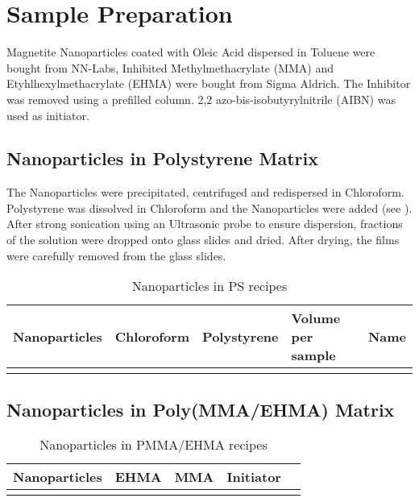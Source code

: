 \chapter{Sample Preparation}
Magnetite Nanoparticles coated with Oleic Acid dispersed in Toluene were bought from NN-Labs, Inhibited Methylmethacrylate (MMA) and Etyhlhexylmethacrylate (EHMA)  were bought from Sigma Aldrich. The Inhibitor was removed using a prefilled column. 
2,2 azo-bis-isobutyrylnitrile (AIBN) was used as initiator.
\section{Nanoparticles in Polystyrene Matrix}
The Nanoparticles were precipitated, centrifuged and redispersed in Chloroform. Polystyrene was dissolved in Chloroform and the Nanoparticles were added (see ). After strong sonication using an Ultrasonic probe to ensure dispersion, fractions of the solution were dropped onto glass slides and dried. After drying, the films were carefully removed from the glass slides.

\begin{table}
	\centering
	\caption{Nanoparticles in PS recipes}
	\label{tab:samplePS}
	\begin{tabular}{lllll}
		\hline
	Nanoparticles & Chloroform & Polystyrene & Volume per sample & Name \\
		\hline
	  & & & &\\       
		\hline
	\end{tabular}
\end{table}

\section{Nanoparticles in Poly(MMA/EHMA)  Matrix}


\begin{table}
	\centering
	\caption{Nanoparticles in PMMA/EHMA recipes}
	\label{tab:samplePS}
	\begin{tabular}{lllll}
		\hline
		Nanoparticles & EHMA & MMA & Initiator \\
		\hline
		& & & &\\       
		\hline
	\end{tabular}
\end{table}




